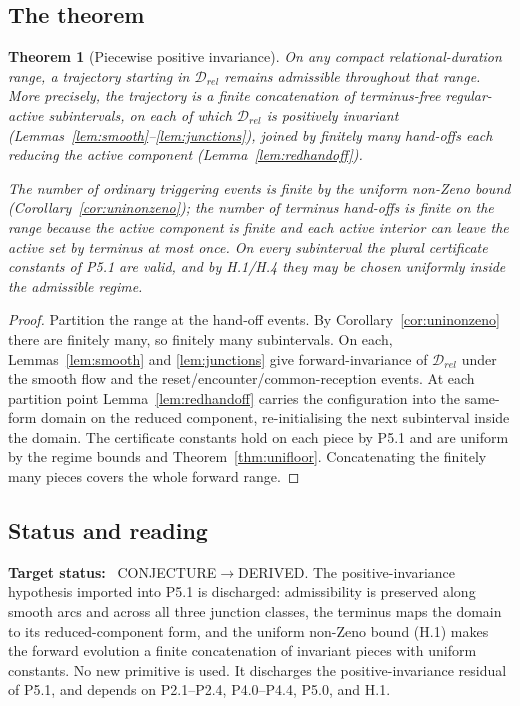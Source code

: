 \documentclass[11pt,a4paper]{article}
\def\mathrm#1{#1}%
\newcommand{\stDerived}{\textcolor{cDer}{\textsf{\small DERIVED}}}
\newcommand{\stConj}{\textcolor{cCon}{\textsf{\small CONJECTURE}}}
\theoremstyle{definition}
\theoremstyle{plain}
\newtheorem{theorem}[definition]{Theorem}
\theoremstyle{remark}
\begin{document}
\subsection{The theorem}

\begin{theorem}[Piecewise positive invariance]\label{thm:invariance}
On any compact relational-duration range, a trajectory starting in \(\mathcal D_{\mathrm{rel}}\)
remains admissible throughout that range. More precisely, the trajectory is a finite
concatenation of terminus-free regular-active subintervals, on each of which
\(\mathcal D_{\mathrm{rel}}\) is positively invariant
(Lemmas~\ref{lem:smooth}--\ref{lem:junctions}), joined by finitely many hand-offs each
reducing the active component (Lemma~\ref{lem:redhandoff}).

The number of ordinary triggering events is finite by the uniform non-Zeno bound
(Corollary~\ref{cor:uninonzeno}); the number of terminus hand-offs is finite on the range
because the active component is finite and each active interior can leave the active set by
terminus at most once. On every subinterval the plural certificate constants of P5.1 are
valid, and by H.1/H.4 they may be chosen uniformly inside the admissible regime.
\end{theorem}

\begin{proof}
Partition the range at the hand-off events. By Corollary~\ref{cor:uninonzeno} there are
finitely many, so finitely many subintervals. On each, Lemmas~\ref{lem:smooth} and
\ref{lem:junctions} give forward-invariance of \(\mathcal D_{\mathrm{rel}}\) under the smooth
flow and the reset/encounter/common-reception events. At each partition point
Lemma~\ref{lem:redhandoff} carries the configuration into the same-form domain on the reduced
component, re-initialising the next subinterval inside the domain. The certificate constants
hold on each piece by P5.1 and are uniform by the regime bounds and Theorem~\ref{thm:unifloor}.
Concatenating the finitely many pieces covers the whole forward range. \qedhere
\end{proof}

\subsection{Status and reading}

\textbf{Target status:}~
\stConj\(\to\)\stDerived. The positive-invariance hypothesis imported into P5.1 is discharged:
admissibility is preserved along smooth arcs and across all three junction classes, the
terminus maps the domain to its reduced-component form, and the uniform non-Zeno bound (H.1)
makes the forward evolution a finite concatenation of invariant pieces with uniform constants.
No new primitive is used. It discharges the positive-invariance residual of P5.1, and depends
on P2.1--P2.4, P4.0--P4.4, P5.0, and H.1.
\end{document}
